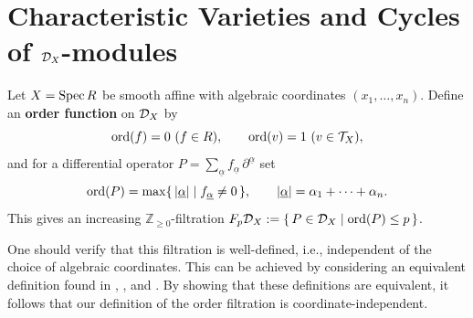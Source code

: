 \section{Characteristic Varieties and Cycles of $\mathcal{D}_X$-modules}
Let $X=\operatorname{Spec} R$ be smooth affine with algebraic coordinates $(x_1,\dots,x_n)$.
Define an \textbf{order function} on $\mathcal{D}_X$ by
\[
    \operatorname{ord}(f)=0\ (f\in R), \qquad \operatorname{ord}(v)=1\ (v\in \mathcal{T}_X),
\]
and for a differential operator $P=\sum_{\underline{\alpha}} f_{\underline{\alpha}}\,\partial^{\underline{\alpha}}$ set
\[
    \operatorname{ord}(P)=\max\{\,|\underline{\alpha}|\mid f_{\underline{\alpha}}\ne 0\,\},\qquad |\underline{\alpha}|=\alpha_1+\cdots+\alpha_n.
\]
This gives an increasing $\mathbb Z_{\ge0}$-filtration $F_p\mathcal{D}_X:=\{\,P\in\mathcal{D}_X\mid \operatorname{ord}(P)\le p\,\}$.

\begin{remark}\label{rmk:order-filtration-is-well-defined}
    One should verify that this filtration is well-defined, i.e., independent of the choice of algebraic coordinates.
    This can be achieved by considering an equivalent definition found in \cite[Definition 3.1.]{chen2024dmodules}, \cite[Definition 2.2.]{mustata2023dmodules}, and \cite[Exercise 1.1.4.]{hotta2008d}.
    By showing that these definitions are equivalent, it follows that our definition of the order filtration is coordinate-independent.
\end{remark}



